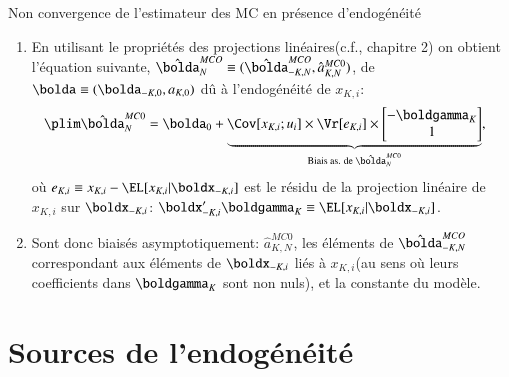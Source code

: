 \begin{frame}[allowframebreaks]{Non convergence de l'estimateur des MC en présence d'endogénéité}
\begin{remark_fr}
\begin{enumerate}[$\star$]
 réécrivons le modèle linéaire:
\begin{align*}
    y_i &= \boldx_{-K, i}^\prime\bolda_{-K, 0} + a_{K, 0}x_{K, i} + u_i, 
    \quad \text{avec} \quad \Exp[\boldx_{-K, i} u_i] = \Exp[u_i]\equiv 0,
\end{align*}
où $\boldx_{-K, i}$ est le vecteur des $K-1$ variables explicatives autres que $x_{K, i}$, 
et $\bolda_{-K, 0}$ leurs coefficients respectifs.
\item En utilisant le propriétés des projections linéaires(c.f., chapitre 2) 
on obtient l'équation suivante,
 $\hat{\bolda}_{N}^{MCO} \equiv (\hat{\bolda}_{-K, N}^{MCO} , \hat{a}^{MC0}_{K, N})$, de
  $\bolda \equiv (\bolda_{-K, 0} ,a_{K, 0})$ dû 
à l’endogénéité de $x_{K, i}$:
\begin{align*}
\plim \hat{\bolda}_N^{MC0}&=\bolda_0 + \underbrace{\Cov[x_{K, i}; u_i]\times \Vr[e_{K, i}]
\times \begin{bmatrix}
    -\boldgamma_K\\
    1
\end{bmatrix}
}_{\text{Biais as. de $\hat{\bolda}_N^{MC0}$} },
\end{align*}
où $e_{K, i} \equiv x_{K, i}-\EL[x_{K, i}| \boldx_{-K, i}]$ 
est le résidu de la projection linéaire de  $x_{K, i}$ sur $\boldx_{-K, i}$: 
$\boldx_{-K, i}^\prime\boldgamma_K\equiv \EL[x_{K, i}| \boldx_{-K, i}]$.
\item Sont donc biaisés asymptotiquement:  $\hat{a}^{MC0}_{K, N}$, 
les éléments de $\hat{\bolda}_{-K, N}^{MCO}$ correspondant aux éléments de $\boldx_{-K, i}$ 
liés à $x_{K, i}$(au sens où leurs coefficients dans $\boldgamma_K$ sont non nuls),
 et la constante du modèle.
\end{enumerate}

\end{remark_fr}
\end{frame}

\section{Sources de l'endogénéité}
\frame{\sectionpage}

